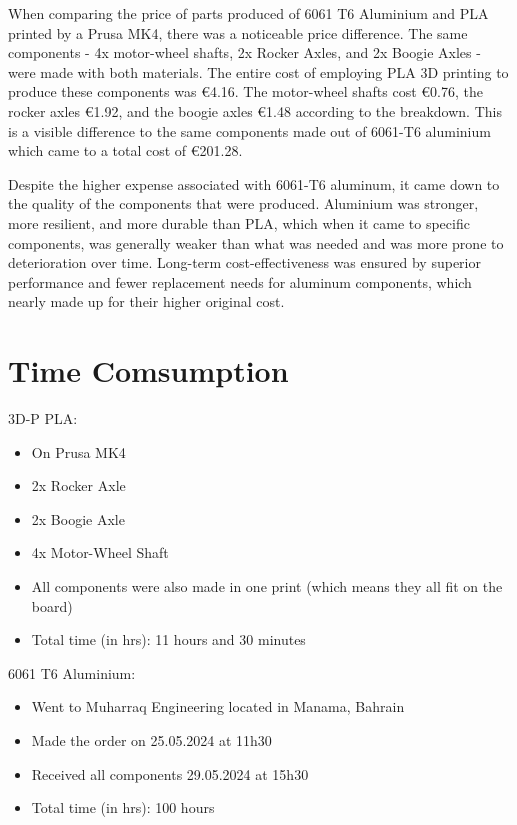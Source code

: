     When comparing the price of parts produced of 6061 T6 Aluminium and PLA printed by a Prusa MK4, there
    was a noticeable price difference. The same components - 4x motor-wheel shafts, 2x Rocker Axles, and 2x Boogie Axles - were made with both materials. The entire cost of employing PLA 3D printing to produce
    these components was €4.16. The motor-wheel shafts cost €0.76, the rocker axles €1.92, and the boogie
    axles €1.48 according to the breakdown. This is a visible difference to the same components made out of
    6061-T6 aluminium which came to a total cost of €201.28.

    Despite the higher expense associated with 6061-T6 aluminum, it came down to the quality of the components that were produced. Aluminium was stronger, more resilient, and more durable than PLA,
    which when it came to specific components, was generally weaker than what was needed and was more
    prone to deterioration over time. Long-term cost-effectiveness was ensured by superior performance
    and fewer replacement needs for aluminum components, which nearly made up for their higher original
    cost.

    \newpage

\section{Time Comsumption}

    3D-P PLA:
    \begin{itemize}
        \item On Prusa MK4
        \item 2x Rocker Axle
        \item 2x Boogie Axle
        \item 4x Motor-Wheel Shaft
        \item All components were also made in one print (which means they all fit on the board)
        \item Total time (in hrs): 11 hours and 30 minutes
    \end{itemize}

    6061 T6 Aluminium:
    \begin{itemize}
        \item Went to Muharraq Engineering located in Manama, Bahrain
        \item Made the order on 25.05.2024 at 11h30
        \item Received all components 29.05.2024 at 15h30
        \item Total time (in hrs): 100 hours
    \end{itemize}

